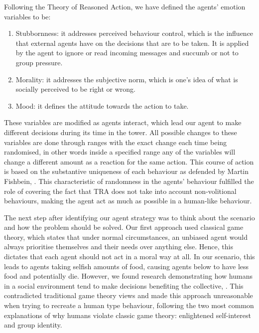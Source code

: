 Following the Theory of Reasoned Action, we have defined the agents’ emotion variables to be: 
\begin{enumerate}
    \item Stubbornness: it addresses perceived behaviour control, which is the influence that external agents have on the decisions that are to be taken. It is applied by the agent to ignore or read incoming messages and succumb or not to group pressure. 
    \item Morality: it addresses the subjective norm, which is one's idea of what is socially perceived to be right or wrong.
    \item Mood: it defines the attitude towards the action to take.
\end{enumerate}
These variables are modified as agents interact, which lead our agent to make different decisions during its time in the tower. All possible changes to these variables are done through ranges with the exact change each time being randomised, in other words inside a specified range any of the variables will change a different amount as a reaction for the same action. This course of action is based on the substantive uniqueness of each behaviour as defended by Martin Fishbein, \cite{TRA}. This characteristic of randomness in the agents’ behaviour fulfilled the role of covering the fact that TRA does not take into account non-volitional behaviours, making the agent act as much as possible in a human-like behaviour. \par
The next step after identifying our agent strategy was to think about the scenario and how the problem should be solved. Our first approach used classical game theory, which states that under normal circumstances, an unbiased agent would always prioritise themselves and their needs over anything else. Hence, this dictates that each agent should not act in a moral way at all. In our scenario, this leads to agents taking selfish amounts of food, causing agents below to have less food and potentially die. However, we found research demonstrating how humans in a social environment tend to make decisions benefiting the collective, \cite{batson_batson_todd_brummett_shaw_aldeguer_1995}. This contradicted traditional game theory views and made this approach unreasonable when trying to recreate a human type behaviour, following the two most common explanations of why humans violate classic game theory: enlightened self-interest and group identity. 


